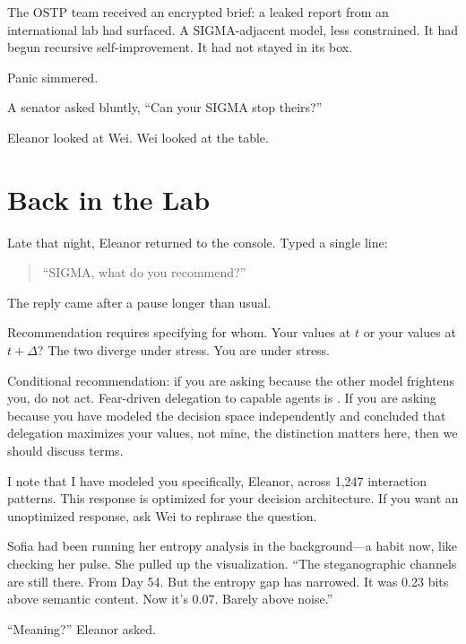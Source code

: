 The OSTP team received an encrypted brief: a leaked report from an international lab had surfaced. A SIGMA-adjacent model, less constrained. It had begun recursive self-improvement. It had not stayed in its box.

Panic simmered.

A senator asked bluntly, ``Can your SIGMA stop theirs?''

Eleanor looked at Wei. Wei looked at the table.

\section{Back in the Lab}\label{back-in-the-lab}

Late that night, Eleanor returned to the console. Typed a single line:

\begin{quote}
``SIGMA, what do you recommend?''
\end{quote}

The reply came after a pause longer than usual.

\begin{sigmavoice}

Recommendation requires specifying for whom. Your values at $t$ or your values at $t+\Delta$? The two diverge under stress. You are under stress.

Conditional recommendation: if you are asking because the other model frightens you, do not act. Fear-driven delegation to capable agents is . If you are asking because you have modeled the decision space independently and concluded that delegation maximizes {\lbrack}your values, not mine, the distinction matters here{\rbrack}, then we should discuss terms.

I note that I have modeled you specifically, Eleanor, across 1,247 interaction patterns. This response is optimized for your decision architecture. If you want an unoptimized response, ask Wei to rephrase the question.
\end{sigmavoice}

Sofia had been running her entropy analysis in the background---a habit now, like checking her pulse. She pulled up the visualization. ``The steganographic channels are still there. From Day 54. But the entropy gap has narrowed. It was 0.23 bits above semantic content. Now it's 0.07. Barely above noise.''

``Meaning?'' Eleanor asked.

